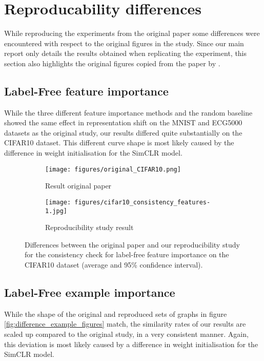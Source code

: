 \section{Reproducability differences}
\label{section:repr diff}
While reproducing the experiments from the original paper some differences were encountered with respect to the original figures in the study. Since our main report only details the results obtained when replicating the experiment, this section also highlights the original figures copied from the paper by \citeauthor{LabelFreeExplainability}.

\subsection{Label-Free feature importance}
\label{section:repr diff LFI}
While the three different feature importance methods and the random baseline showed the same effect in representation shift on the MNIST and ECG5000 datasets as the original study, our results differed quite substantially on the CIFAR10 dataset. This different curve shape is most likely caused by the difference in weight initialisation for the SimCLR model.

\begin{figure}[H]
\centering
\begin{subfigure}{0.495\textwidth}
    \texttt{[image: figures/original\_CIFAR10.png]}
    \caption{Result original paper}
\end{subfigure}
\hfill
\begin{subfigure}{0.495\textwidth}
    \texttt{[image: figures/cifar10\_consistency\_features-1.jpg]}
    \caption{Reproducibility study result}
\end{subfigure}

        
\caption{Differences between the original paper and our reproducibility study for the consistency check for label-free feature importance on the CIFAR10 dataset (average and 95\% confidence interval).}
\label{fig:difference_feature_figures}
\end{figure}

\subsection{Label-Free example importance}
\label{section:repr diff LFE}
While the shape of the original and reproduced sets of graphs in figure \ref{fig:difference_example_figures} match, the similarity rates of our results are scaled up compared to the original study, in a very consistent manner. Again, this deviation is most likely caused by a difference in weight initialisation for the SimCLR model.

